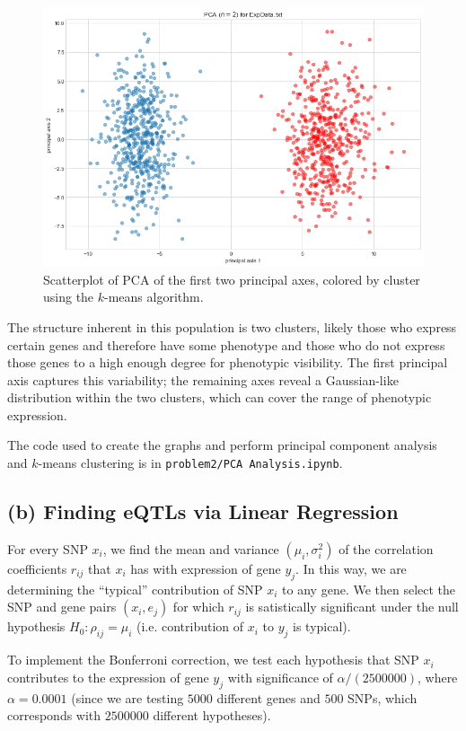 \documentclass{article}[11pt]
\begin{document}
\begin{figure}[H]
\includegraphics[width=\textwidth]{./imgs/pca_clustered.png}
\caption{Scatterplot of PCA of the first two principal axes,
colored by cluster using the $k$-means algorithm.}
\end{figure}

The structure inherent in this population is two clusters,
likely those who express certain genes and therefore
have some phenotype and those who do not express those
genes to a high enough degree for phenotypic visibility.
The first principal axis captures this variability; the
remaining axes reveal a Gaussian-like distribution
within the two clusters, which can cover the range
of phenotypic expression.

The code used to create the graphs and perform principal
component analysis and $k$-means clustering
is in {\tt problem2/PCA Analysis.ipynb}.


\subsection*{(b) Finding eQTLs via Linear Regression}
For every SNP $x_i$, we find the mean and variance
$(\mu_{i}, \sigma_{i}^2)$ of the correlation coefficients $r_{ij}$ that 
$x_i$ has with expression of gene $y_j$. In this way, we are determining
the ``typical'' contribution of SNP $x_i$ to any gene.
We then select the SNP and gene pairs $(x_i, e_j)$ for which
$r_{ij}$ is satistically significant
under the null hypothesis $H_0: \rho_{ij} = \mu_{i}$ (i.e. contribution
of $x_i$ to $y_j$ is typical).

To implement the Bonferroni correction, we test
each hypothesis that SNP $x_i$ contributes
to the expression of gene $y_j$ with significance
of $\alpha / (2500000)$, where $\alpha = 0.0001$
(since we are testing $5000$ different genes and
$500$ SNPs, which corresponds with $2500000$ different hypotheses).
\end{document}
